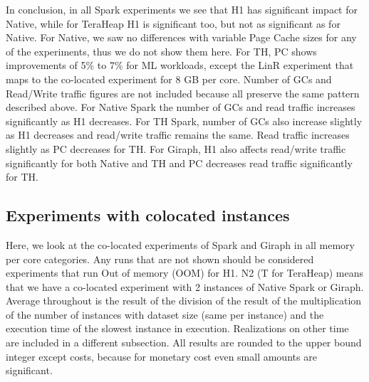 In conclusion, in all Spark experiments we see that H1 has significant impact for Native, while for TeraHeap H1 is significant too, but not as significant as for Native. For Native, we saw no differences with variable Page Cache sizes for any of the experiments, thus we do not show them here. For TH, PC shows improvements of 5\% to 7\% for ML workloads, except the LinR experiment that maps to the co-located experiment for 8 GB per core. Number of GCs and Read/Write traffic figures are not included because all preserve the same pattern described above. For Native Spark the number of GCs and read traffic increases significantly as H1 decreases. For TH Spark, number of GCs also increase slightly as H1 decreases and read/write traffic remains the same. Read traffic increases slightly as PC decreases for TH. For Giraph, H1 also affects read/write traffic significantly for both Native and TH and PC decreases read traffic significantly for TH.

\subsection{Experiments with colocated instances}

Here, we look at the co-located experiments of Spark and Giraph in all memory per core categories.
Any runs that are not shown should be considered experiments that run Out of memory (OOM) for H1.
N2 (T for TeraHeap) means that we have a co-located experiment with 2 instances of Native Spark or Giraph.
Average throughout is the result of the division of the result of the multiplication of the number of instances with dataset size (same per instance) and the execution time of the slowest instance in execution. Realizations on other time are included in a different subsection.
All results are rounded to the upper bound integer except costs, because for monetary cost even small amounts are significant.

